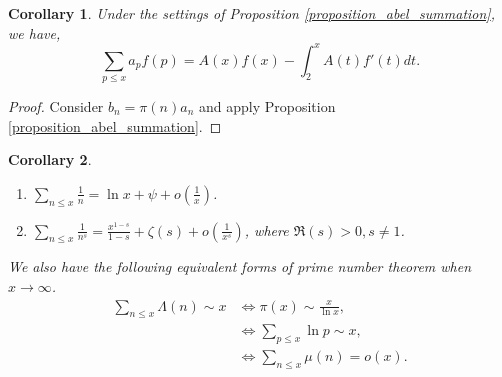 \documentclass{article}
\newtheorem{corollary}{Corollary} [section]
\begin{document}
\begin{corollary}
  \par Under the settings of Proposition \ref{proposition_abel_summation}, we have,
\begin{equation*}
  \sum_{p\leq x}a_pf(p) = A(x)f(x) - \int_2^x A(t)f'(t)dt.
\end{equation*}
\label{corollary_abels_summation_primes}
\end{corollary}

\begin{proof}
  Consider $b_n = \pi(n)a_n$ and apply Proposition \ref{proposition_abel_summation}.
\end{proof}


\begin{corollary}$\:$
  \begin{enumerate}
    \item $\sum_{n\leq x}{\frac 1 n} = \ln x + \psi + o\left({\frac 1 x}\right)$.
    \item $\sum_{n\leq x} {\frac 1 {n^s}} = {\frac {x^{1-s}} {1-s}}+\zeta(s)+o\left({\frac 1 {x^s}}\right)$, where $\Re(s)>0,s\not=1$. 
  \end{enumerate}
  We also have the following equivalent forms of prime number theorem when $x\to \infty$.
  \begin{align*}
    \sum_{n\leq x}\Lambda(n) \sim x&\Leftrightarrow \pi(x) \sim {\frac x {\ln x}},\\
    & \Leftrightarrow \sum_{p\leq x}\ln p \sim x,\\
    & \Leftrightarrow \sum_{n\leq x}\mu(n) = o(x).
  \end{align*}
  \label{corollary_analytic_continuation_zeta}
\end{corollary}
\end{document}
